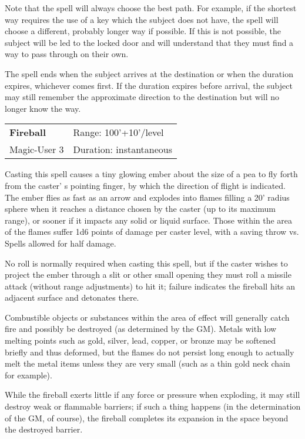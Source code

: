\documentclass[a4paper,twoside,openany,10pt]{book}
\begin{document}
\begin{multicols}{2}
Note that the spell will always choose the best path. For example, if the shortest way requires the use of a key which the subject does not have, the spell will choose a different, probably longer way if possible. If this is not possible, the subject will be led to the locked door and will understand that they must find a way to pass through on their own.

The spell ends when the subject arrives at the destination or when the duration expires, whichever comes first. If the duration expires before arrival, the subject may still remember the approximate direction to the destination but will no longer know the way.


\smallskip\begin{flushleft} 
	\begin{tabularx}{0.45\textwidth}{@{}m{3.5cm}m{5.5cm}@{}} 
		\textbf{Fireball} & Range: 100'+10'/level\\
Magic-User 3 &Duration: instantaneous\\
	\end{tabularx}\end{flushleft}

Casting this spell causes a tiny glowing ember about the size of a pea to fly forth from the caster' s pointing finger, by which the direction of flight is indicated. The ember flies as fast as an arrow and explodes into flames filling a 20' radius sphere when it reaches a distance chosen by the caster (up to its maximum range), or sooner if it impacts any solid or liquid surface. Those within the area of the flames suffer 1d6 points of damage per caster level, with a saving throw vs. Spells allowed for half damage.

No roll is normally required when casting this spell, but if the caster wishes to project the ember through a slit or other small opening they must roll a missile attack (without range adjustments) to hit it; failure indicates the fireball hits an adjacent surface and detonates there.

Combustible objects or substances within the area of effect will generally catch fire and possibly be destroyed (as determined by the GM). Metals with low melting points such as gold, silver, lead, copper, or bronze may be softened briefly and thus deformed, but the flames do not persist long enough to actually melt the metal items unless they are very small (such as a thin gold neck chain for example).

While the fireball exerts little if any force or pressure when exploding, it may still destroy weak or flammable barriers; if such a thing happens (in the determination of the GM, of course), the fireball completes its expansion in the space beyond the destroyed barrier.


\end{multicols}
\end{document}
